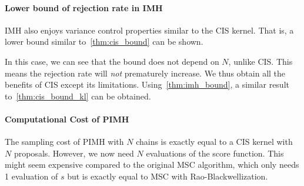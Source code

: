 \vspace{-0.1in}
\paragraph{Lower bound of rejection rate in IMH}
IMH also enjoys variance control properties similar to the CIS kernel.
That is, a lower bound similar to~\cref{thm:cis_bound} can be shown.
%

%
In this case, we can see that the bound does not depend on \(N\), unlike CIS.
This means the rejection rate will \textit{not} prematurely increase.
We thus obtain all the benefits of CIS except its limitations.
Using~\cref{thm:imh_bound}, a similar result to~\cref{thm:cis_bound_kl} can be obtained.

\vspace{-0.1in}
\paragraph{Computational Cost of PIMH}
The sampling cost of PIMH with \(N\) chains is exactly equal to a CIS kernel with \(N\) proposals.
However, we now need \(N\) evaluations of the score function.
This might seem expensive compared to the original MSC algorithm, which only needs 1 evaluation of \(s\) but is exactly equal to MSC with Rao-Blackwellization.

